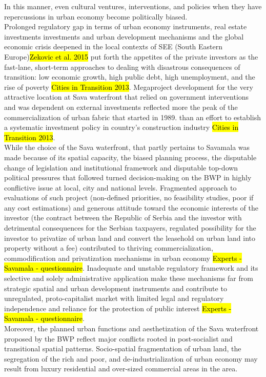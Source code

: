 \documentclass[11pt]{report}
\begin{document}
In this manner, even cultural ventures, interventions, and policies when they have repercussions in urban economy become politically biased.
\\
Prolonged regulatory gap in terms of urban economy instruments, real estate investments investments and urban development mechanisms and the global economic crisis deepened in the local contexts of SEE (South Eastern Europe)\hl{Zekovic et al. 2015} put forth the appetites of the private investors as the fast-lane, short-term approaches to dealing with disastrous consequences of transition: low economic growth, high public debt, high unemployment, and the rise of poverty \hl{Cities in Transition 2013}.
Megaproject development for the very attractive location at Sava waterfront that relied on government interventions and was dependent on external investments reflected more the peak of the commercialization of urban fabric that started in 1989. \cite{Hirt 2009} than an effort to establish a systematic investment policy in country's construction industry \hl{Cities in Transition 2013}.
\\
While the choice of the Sava waterfront, that partly pertains to Savamala was made because of its spatial capacity, the biased planning process, the disputable change of legislation and institutional framework and disputable top-down political pressures that followed turned decision-making on the BWP in highly conflictive issue at local, city and national levels.
Fragmented approach to evaluations of such project (non-defined priorities, no feasibility studies, poor if any cost estimations) and generous attitude toward the economic interests of the investor (the contract between the Republic of Serbia and the investor with detrimental consequences for the Serbian taxpayers, regulated possibility for the investor to privatize of urban land and convert the leasehold on urban land into property without a fee) contributed to thriving commercialization, commodification and privatization mechanisms in urban economy \hl{Experts - Savamala - questionnaire}.
Inadequate and unstable regulatory framework and its selective and solely administrative application make these mechanisms far from strategic spatial and urban development instruments and contribute to unregulated, proto-capitalist market with limited legal and regulatory independence and reliance for the protection of public interest \hl{Experts - Savamala - questionnaire}.
\\
Moreover, the planned urban functions and aesthetization of the Sava waterfront proposed by the BWP reflect major conflicts rooted in post-socialist and transitional spatial patterns. Socio-spatial fragmentation of urban land, the segregation of the rich and poor, and de-industrialization of urban economy may result from luxury residential and over-sized commercial areas in the area.
\end{document}
